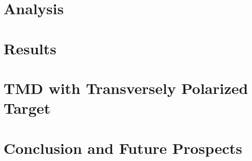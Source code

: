 \documentclass{uiucthesis2021}
\begin{document}
\chapter{Analysis}
\label{ch:analysis}


\chapter{Results}
\label{ch:tesult}


\chapter{TMD with Transversely Polarized Target}
\label{ch:spinquest}



\chapter{Conclusion and Future Prospects}
\label{ch:conclusion}



\backmatter

\printbibliography[heading=bibintoc,title={References}]
\end{document}
